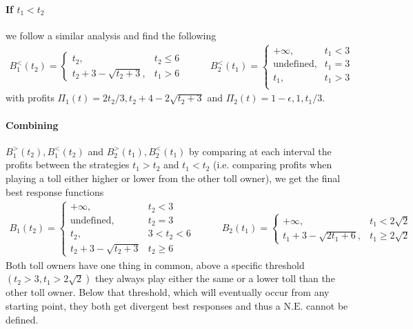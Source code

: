 \documentclass[10pt,a4paper]{book}
\newcommand{\NE}{\mathrm{N.E.}}
\theoremstyle{definition}
\theoremstyle{comment}
\begin{document}
\paragraph{If $t_1 < t_2$}
we follow a similar analysis and find the following
\begin{equation*}
	\begin{aligned}
		B_1^<(t_2) =
			\begin{cases}
				t_2, & t_2 \le 6 \\
				t_2 + 3 - \sqrt{t_2 + 3}, & t_1 > 6
			\end{cases}
	\end{aligned}
	\qquad
	\begin{aligned}
		B_2^<(t_1) =
			\begin{cases}
				+\infty, & t_1 < 3 \\
				\textrm{undefined}, & t_1 = 3 \\
				t_1, & t_1 > 3 \\
			\end{cases}
	\end{aligned}
\end{equation*}
with profits $\Pi_1(t) = {2 t_2}/3, t_2 + 4 - 2 \sqrt{t_2 + 3}$ and $\Pi_2(t) = 1 - \epsilon, 1, t_1/3$.

\paragraph{Combining} $B_1^>(t_2), B_1^<(t_2)$ and $B_2^>(t_1), B_2^<(t_1)$ by comparing at each interval the profits between the strategies $t_1 > t_2$ and $t_1 < t_2$ (i.e. comparing profits when playing a toll either higher or lower from the other toll owner), we get the final best response functions
\begin{equation*}
	\begin{aligned}
		B_1(t_2) =
			\begin{cases}
				+\infty, & t_2 < 3 \\
				\textrm{undefined}, & t_2 = 3 \\
				t_2, & 3 < t_2 < 6 \\
				t_2 + 3 - \sqrt{t_2 + 3} & t_2 \ge 6
			\end{cases}
	\end{aligned}
	\qquad
	\begin{aligned}
		B_2(t_1) =
			\begin{cases}
				+\infty, & t_1 < 2 \sqrt{2} \\
				t_1 + 3 - \sqrt{2 t_1 + 6}, & t_1 \ge 2 \sqrt{2}
			\end{cases}
	\end{aligned}
\end{equation*}
Both toll owners have one thing in common, above a specific threshold $(t_2 > 3, t_1 > 2 \sqrt{2})$ they always play either the same or a lower toll than the other toll owner.
Below that threshold, which will eventually occur from any starting point, they both get divergent best responses and thus a $\NE$ cannot be defined.
\end{document}
